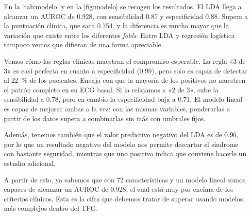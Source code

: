 En la \cref{tab:modelo} y en la \cref{fig:modelo} se recogen los resultados. El LDA llega a alcanzar un AUROC de \num{0.928}, con sensibilidad \num{0.87} y especificidad \num{0.88}. Supera a la puntuación clínica, que saca \num{0.754}, y la diferencia es mucho mayor que la variación que existe entre los diferentes \emph{folds}. Entre LDA y regresión logística tampoco vemos que difieran de una forma apreciable.


Vemos cómo las reglas clínicas muestran el compromiso esperable. La regla «3 de 3» es casi perfecta en cuanto a especificidad (\num{0.99}), pero solo es capaz de detectar al \SI{22}{\percent} de los pacientes. Encaja con que la mayoría de los positivos no muestren el patrón completo en su ECG basal. Si la relajamos a «2 de 3», sube la sensibilidad a \num{0.78}, pero en cambio la especificidad baja a \num{0.71}. El modelo lineal es capaz de mejorar ambas a la vez: con las mismas variables, ponderarlas a partir de los datos supera a combinarlas sin más con umbrales fijos.

Además, tenemos también que el valor predictivo negativo del LDA es de \num{0.96}, por lo que un resultado negativo del modelo nos permite descartar el síndrome con bastante seguridad, mientras que uno positivo indica que conviene hacerle un estudio adicional.

A partir de esto, ya sabemos que con 72 características y un modelo lineal somos capaces de alcanzar un AUROC de \num{0.928}, el cual está muy por encima de los criterios clínicos. Esta es la cifra que debemos tratar de superar usando modelos más complejos dentro del TFG.
